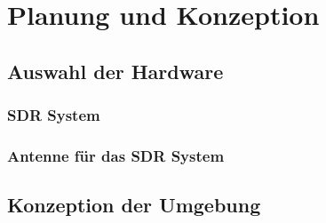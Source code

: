 
\chapter{Planung und Konzeption}
\section{Auswahl der Hardware}
\subsection{SDR System}
\subsection{Antenne für das SDR System}

\section{Konzeption der Umgebung}